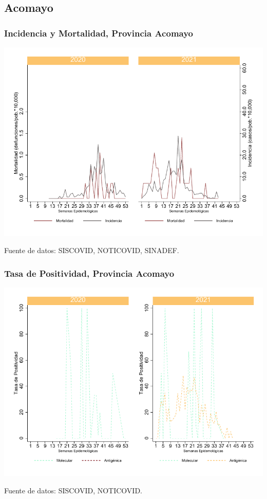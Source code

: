 \documentclass[xcolor=table]{beamer}
\begin{document}
\subsection{Acomayo}

\begin{frame}[label=Acomayo]
	\frametitle{Incidencia y Mortalidad, Provincia Acomayo}
	\vspace{-.5cm}
	\begin{center}
		\includegraphics[width=0.8\linewidth, trim={0cm .5cm 0cm 0.2cm},clip]{../figuras/incidencia_mortalidad_20_21_1.pdf}
	\end{center}
	{\tiny Fuente de datos: SISCOVID, NOTICOVID, SINADEF.}
\end{frame}

\begin{frame}
	\frametitle{Tasa de Positividad, Provincia Acomayo}
	\vspace{-.5cm}
	\begin{center}
		\includegraphics[width=0.8\linewidth, trim={0cm .5cm 0cm 0.2cm},clip]{../figuras/positividad_20_21_1.pdf}
	\end{center}
	{\tiny Fuente de datos: SISCOVID, NOTICOVID.}
\end{frame}
\end{document}
